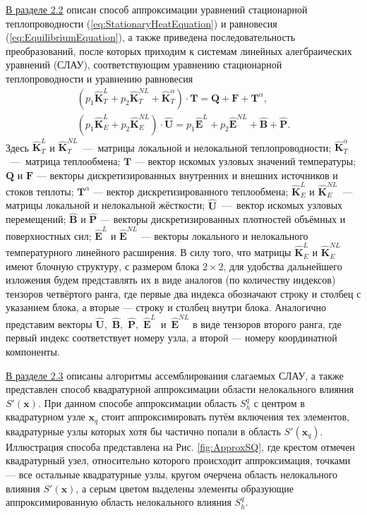 \underline{В разделе 2.2} описан способ аппроксимации уравнений стационарной теплопроводности (\ref{eq:StationaryHeatEquation}) и равновесия (\ref{eq:EquilibriumEquation}), а также приведена последовательность преобразований, после которых приходим к системам линейных алегбраических уравнений (СЛАУ), соответствующим уравнению стационарной теплопроводности и уравнению равновесия
\begin{gather}
	\label{eq:ThermalSLAE}
	\left( p_1 \widehat{\textbf{K}}^L_T + p_2 \widehat{\textbf{K}}^{NL}_T + \widehat{\textbf{K}}^{\alpha}_T \right) \cdot \textbf{T} = \textbf{Q} + \textbf{F} + \textbf{T}^{\alpha},
\\
	\label{eq:StressSLAE}
	\left( p_1 \widehat{\textbf{K}}^L_E + p_2 \widehat{\textbf{K}}^{NL}_E \right) \cdot \widehat{\textbf{U}} = p_1 \widehat{\textbf{E}}^L + p_2 \widehat{\textbf{E}}^{NL} + \widehat{\textbf{B}} + \widehat{\textbf{P}}.
\end{gather}
Здесь $\widehat{\textbf{K}}^L_T$ и $\widehat{\textbf{K}}^{NL}_T$~---~матрицы локальной и нелокальной теплопроводности;
$\widehat{\textbf{K}}^{\alpha}_T$~---~матрица теплообмена;
$\textbf{T}$ --- вектор искомых узловых значений температуры;
$\textbf{Q}$ и $\textbf{F}$ --- векторы дискретизированных внутренних и внешних источников и стоков теплоты;
$\textbf{T}^{\alpha}$ --- вектор дискретизированного теплообмена;
$\widehat{\textbf{K}}^L_E$ и $\widehat{\textbf{K}}^{NL}_E$~--- матрицы локальной и нелокальной жёсткости;
$\widehat{\textbf{U}}$~---~вектор искомых узловых перемещений;
$\widehat{\textbf{B}}$ и $\widehat{\textbf{P}}$ --- векторы дискретизированных плотностей объёмных и поверхностных сил;
$\widehat{\textbf{E}}^L$ и $\widehat{\textbf{E}}^{NL}$ --- векторы локального и нелокального температурного линейного расширения.
В силу того, что матрицы $\widehat{\textbf{K}}^L_E$ и $\widehat{\textbf{K}}^{NL}_E$ имеют блочную структуру, с размером блока $2 \times 2$, для удобства дальнейшего изложения будем представлять их в виде аналогов (по количеству индексов) тензоров четвёртого ранга, где первые два индекса обозначают строку и столбец с указанием блока, а вторые --- строку и столбец внутри блока.
Аналогично представим векторы \mbox{$\widehat{\textbf{U}}$, $\widehat{\textbf{B}}$, $\widehat{\textbf{P}}$, $\widehat{\textbf{E}}^L$ и $\widehat{\textbf{E}}^{NL}$} в виде тензоров второго ранга, где первый индекс соответствует номеру узла, а второй --- номеру координатной компоненты.

\underline{В разделе 2.3} описаны алгоритмы ассемблирования слагаемых СЛАУ, а также представлен способ квадратурной аппроксимации области нелокального влияния $S'(\boldsymbol{x})$. При данном способе аппроксимации область $S_h^q$ с центром в квадратурном узле $\boldsymbol{x}_q$ стоит аппроксимировать путём включения тех элементов, квадратурные узлы которых хотя бы частично попали в область $S'(\boldsymbol{x}_q)$. Иллюстрация способа представлена на Рис. \ref{fig:ApproxSQ}, где крестом отмечен квадратурный узел, относительно которого происходит аппроксимация, точками --- все остальные квадратурные узлы, кругом очерчена область нелокального влияния $S'(\boldsymbol{x})$, а серым цветом выделены элементы образующие аппроксимированную область нелокального влияния $S_h^q$.

